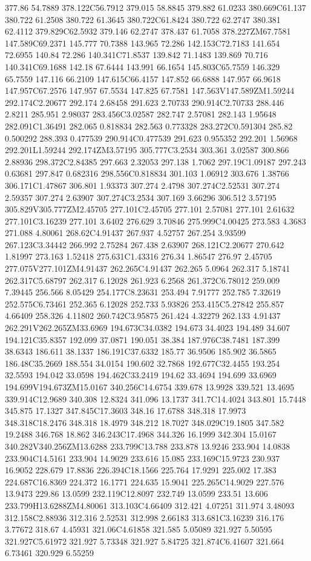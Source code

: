 377.86 54.7889 378.122C56.7912 379.015 58.8845 379.882 61.0233 380.669C61.137 380.722 61.2508 380.722 61.3645 380.722C61.8424 380.722 62.2747 380.381 62.4112 379.829C62.5932 379.146 62.2747 378.437 61.7058 378.227ZM67.7581 147.589C69.2371 145.777 70.7388 143.965 72.286 142.153C72.7183 141.654 72.6955 140.84 72.286 140.341C71.8537 139.842 71.1483 139.869 70.716 140.341C69.1688 142.18 67.6444 143.991 66.1654 145.803C65.7559 146.329 65.7559 147.116 66.2109 147.615C66.4157 147.852 66.6888 147.957 66.9618 147.957C67.2576 147.957 67.5534 147.825 67.7581 147.563V147.589ZM1.59244 292.174C2.20677 292.174 2.68458 291.623 2.70733 290.914C2.70733 288.446 2.8211 285.951 2.98037 283.456C3.02587 282.747 2.57081 282.143 1.95648 282.091C1.36491 282.065 0.818834 282.563 0.773328 283.272C0.591304 285.82 0.500292 288.393 0.477539 290.914C0.477539 291.623 0.955352 292.201 1.56968 292.201L1.59244 292.174ZM3.57195 305.777C3.2534 303.361 3.02587 300.866 2.88936 298.372C2.84385 297.663 2.32053 297.138 1.7062 297.19C1.09187 297.243 0.63681 297.847 0.682316 298.556C0.818834 301.103 1.06912 303.676 1.38766 306.171C1.47867 306.801 1.93373 307.274 2.4798 307.274C2.52531 307.274 2.59357 307.274 2.63907 307.274C3.2534 307.169 3.66296 306.512 3.57195 305.829V305.777ZM2.45705 277.101C2.45705 277.101 2.57081 277.101 2.61632 277.101C3.16239 277.101 3.6402 276.629 3.70846 275.999C4.00425 273.583 4.3683 271.088 4.80061 268.62C4.91437 267.937 4.52757 267.254 3.93599 267.123C3.34442 266.992 2.75284 267.438 2.63907 268.121C2.20677 270.642 1.81997 273.163 1.52418 275.631C1.43316 276.34 1.86547 276.97 2.45705 277.075V277.101ZM4.91437 262.265C4.91437 262.265 5.0964 262.317 5.18741 262.317C5.68797 262.317 6.12028 261.923 6.2568 261.372C6.78012 259.009 7.39445 256.566 8.05429 254.177C8.23631 253.494 7.91777 252.785 7.32619 252.575C6.73461 252.365 6.12028 252.733 5.93826 253.415C5.27842 255.857 4.66409 258.326 4.11802 260.742C3.95875 261.424 4.32279 262.133 4.91437 262.291V262.265ZM33.6969 194.673C34.0382 194.673 34.4023 194.489 34.607 194.121C35.8357 192.099 37.0871 190.051 38.384 187.976C38.7481 187.399 38.6343 186.611 38.1337 186.191C37.6332 185.77 36.9506 185.902 36.5865 186.48C35.2669 188.554 34.0154 190.602 32.7868 192.677C32.4455 193.254 32.5593 194.042 33.0598 194.462C33.2419 194.62 33.4694 194.699 33.6969 194.699V194.673ZM15.0167 340.256C14.6754 339.678 13.9928 339.521 13.4695 339.914C12.9689 340.308 12.8324 341.096 13.1737 341.7C14.4024 343.801 15.7448 345.875 17.1327 347.845C17.3603 348.16 17.6788 348.318 17.9973 348.318C18.2476 348.318 18.4979 348.212 18.7027 348.029C19.1805 347.582 19.2488 346.768 18.862 346.243C17.4968 344.326 16.1999 342.304 15.0167 340.282V340.256ZM13.6288 233.799C13.788 233.878 13.9246 233.904 14.0838 233.904C14.5161 233.904 14.9029 233.616 15.085 233.169C15.9723 230.937 16.9052 228.679 17.8836 226.394C18.1566 225.764 17.9291 225.002 17.383 224.687C16.8369 224.372 16.1771 224.635 15.9041 225.265C14.9029 227.576 13.9473 229.86 13.0599 232.119C12.8097 232.749 13.0599 233.51 13.606 233.799H13.6288ZM4.80061 313.103C4.66409 312.421 4.07251 311.974 3.48093 312.158C2.88936 312.316 2.52531 312.998 2.66183 313.681C3.16239 316.176 3.77672 318.67 4.45931 321.06C4.61858 321.585 5.05089 321.927 5.50595 321.927C5.61972 321.927 5.73348 321.927 5.84725 321.874C6.41607 321.664 6.73461 320.929 6.55259 